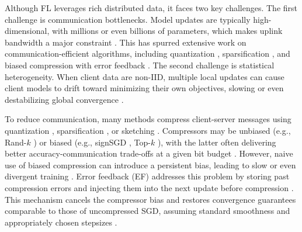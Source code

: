 \documentclass{article} %
\begin{document}
Although FL leverages rich distributed data, it faces two key challenges. The first challenge is communication bottlenecks. Model updates are typically high-dimensional, with millions or even billions of parameters, which makes uplink bandwidth a major constraint \citep{reisizadeh2020fedpaq,kim2024spafl,islamov2025safeef}. This has spurred extensive work on communication-efficient algorithms, including quantization \citep{seide2014onebit,alistarh2017qsgd}, sparsification \citep{stich2018sparsified}, and biased compression with error feedback \citep{beznosikov2023biased,bao2025efskip}. The second challenge is statistical heterogeneity. When client data are non-IID, multiple local updates can cause client models to drift toward minimizing their own objectives, slowing or even destabilizing global convergence \citep{karimireddy2020scaffold,li2023analysis}.  

To reduce communication, many methods compress client-server messages using quantization \citep{alistarh2017qsgd}, sparsification \citep{lin2018deep}, or sketching \citep{rothchild2020fetchsgd}. Compressors may be unbiased (e.g., Rand-$k$ \citep{wangni2018gradient, stich2018sparsified}) or biased (e.g., signSGD \citep{bernstein2018signsgd}, Top-$k$ \citep{lin2018deep}), with the latter often delivering better accuracy-communication trade-offs at a given bit budget \citep{beznosikov2023biased}. However, naive use of biased compression can introduce a persistent bias, leading to slow or even divergent training \citep{beznosikov2023biased, li2023analysis}. Error feedback (EF) addresses this problem by storing past compression errors and injecting them into the next update before compression \citep{seide2014onebit}. This mechanism cancels the compressor bias and restores convergence guarantees comparable to those of uncompressed SGD, assuming standard smoothness and appropriately chosen stepsizes \citep{karimireddy2019error, bao2025efskip}.
\end{document}
